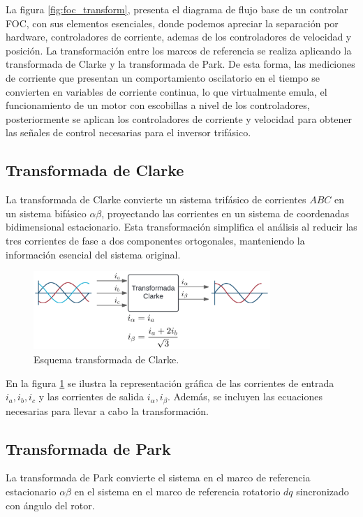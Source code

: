 \documentclass[11pt]{report}
\begin{document}
La figura \ref{fig:foc_transform}, presenta el diagrama de flujo base de un controlar FOC, con sus elementos esenciales, donde podemos apreciar la separación por hardware, controladores de corriente, ademas de los controladores de velocidad y posición. La transformación entre los marcos de referencia se realiza aplicando la transformada de Clarke y la transformada de Park. De esta forma, las mediciones de corriente que presentan un comportamiento oscilatorio en el tiempo se convierten en variables de corriente continua, lo que virtualmente emula, el funcionamiento de un motor con escobillas a nivel de los controladores\cite{power_conv_14}, posteriormente se aplican los controladores de corriente y velocidad para obtener las señales de control necesarias para el inversor trifásico. 

\newpage
\subsection{Transformada de Clarke}
La transformada de Clarke convierte un sistema trifásico de corrientes \(ABC\) en un sistema bifásico \(\alpha\beta\), proyectando las corrientes en un sistema de coordenadas bidimensional estacionario. Esta transformación simplifica el análisis al reducir las tres corrientes de fase a dos componentes ortogonales, manteniendo la información esencial del sistema original. \cite{AN1078}

\begin{figure}[ht]
	\centering
	\includegraphics[width=0.8\textwidth]{imagenes/Diagramas/clarke.png}
	\caption{Esquema transformada de Clarke.}
	\label{fig:clarke_transform}
\end{figure}
\FloatBarrier

En la figura \ref{fig:clarke_transform} se ilustra la representación gráfica de las corrientes de entrada \(i_a, i_b, i_c\) y las corrientes de salida \(i_\alpha, i_\beta\). Además, se incluyen las ecuaciones necesarias para llevar a cabo la transformación.

\subsection{Transformada de Park}
La transformada de Park convierte el sistema en el marco de referencia estacionario \(\alpha\beta\) en el sistema en el marco de referencia rotatorio \(dq\) sincronizado con ángulo del rotor\cite{AN1078}.
\end{document}
